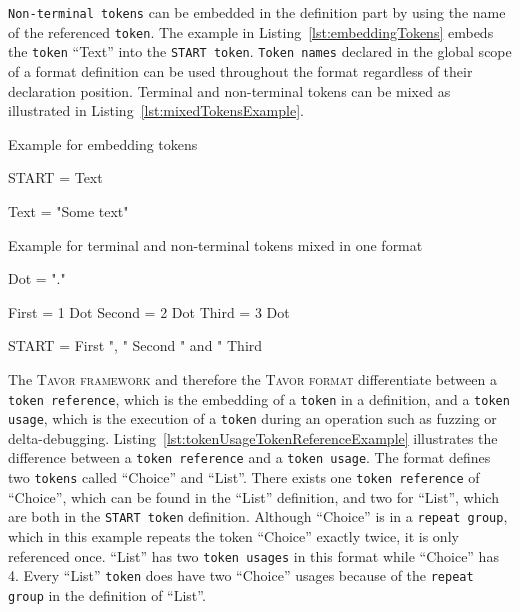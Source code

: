 \texttt{Non-terminal tokens} can be embedded in the definition part by using the name of the referenced \texttt{token}. The example in Listing~\ref{lst:embeddingTokens} embeds the \texttt{token} \enquote{Text} into the \texttt{START token}. \texttt{Token names} declared in the global scope of a format definition can be used throughout the format regardless of their declaration position. Terminal and non-terminal tokens can be mixed as illustrated in Listing~\ref{lst:mixedTokensExample}.

\begin{listing}
\caption{Example for embedding tokens}
\label{lst:embeddingTokens}
\begin{gocode}
START = Text

Text = "Some text"
\end{gocode}
\end{listing}

\begin{listing}
\caption{Example for terminal and non-terminal tokens mixed in one format}
\label{lst:mixedTokensExample}
\begin{gocode}
Dot = "."

First  = 1 Dot
Second = 2 Dot
Third  = 3 Dot

START = First ", " Second " and " Third
\end{gocode}
\end{listing}

The \textsc{Tavor framework} and therefore the \textsc{Tavor format} differentiate between a \texttt{token reference}, which is the embedding of a \texttt{token} in a definition, and a \texttt{token usage}, which is the execution of a \texttt{token} during an operation such as fuzzing or delta-debugging. Listing~\ref{lst:tokenUsageTokenReferenceExample} illustrates the difference between a \texttt{token reference} and a \texttt{token usage}. The format defines two \texttt{tokens} called \enquote{Choice} and \enquote{List}. There exists one \texttt{token reference} of \enquote{Choice}, which can be found in the \enquote{List} definition, and two for \enquote{List}, which are both in the \texttt{START token} definition. Although \enquote{Choice} is in a \texttt{repeat group}, which in this example repeats the token \enquote{Choice} exactly twice, it is only referenced once. \enquote{List} has two \texttt{token usages} in this format while \enquote{Choice} has 4. Every \enquote{List} \texttt{token} does have two \enquote{Choice} usages because of the \texttt{repeat group} in the definition of \enquote{List}.

